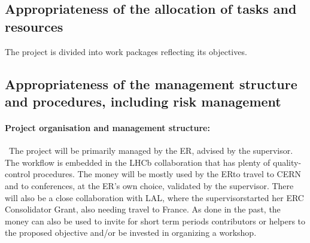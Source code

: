 \documentclass[a4paper,11pt]{article}
\newcommand{\ER}{ER}
\newcommand{\supervisor}{the supervisor}
\begin{document}
%        


\subsection{Appropriateness of the allocation of tasks and resources }


The project is divided into work packages reflecting its objectives. 

%            

\subsection{Appropriateness of the management structure and procedures, including risk management }


\paragraph{Project organisation and management structure: }\
The project will be primarily managed by the \ER, advised by \supervisor. The workflow is embedded in the LHCb
collaboration that has plenty of quality-control procedures. The money will be mostly used by the \ER to travel to
CERN and to conferences, at the \ER’s own choice, validated by \supervisor. There will also be a close collaboration with LAL, where \supervisor started her ERC Consolidator Grant, also needing travel to France. As done in the past,
the money can also be used to invite for short term periods contributors or helpers to the proposed objective and/or
be invested in organizing a workshop.
\end{document}
